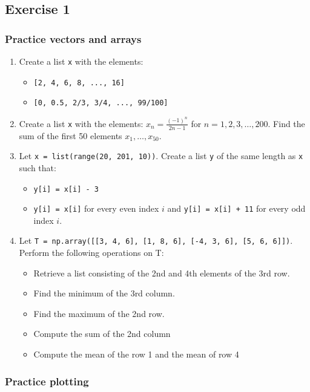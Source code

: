 \subsection*{Exercise 1}
\begin{frame}[fragile]
  \frametitle{Practice vectors and arrays}
  \begin{enumerate}
    \item Create a list \lstinline|x| with the elements:
    \begin{itemize}
      \item \lstinline|[2, 4, 6, 8, ..., 16]|
      \item \lstinline|[0, 0.5, 2/3, 3/4, ..., 99/100]|
    \end{itemize}
    \item Create a list \lstinline|x| with the elements: \(x_n = \frac{(-1)^n}{2n-1}\) for \(n=1,2,3,\ldots,200\). Find the sum of the first 50 elements \(x_1,\ldots,x_{50}\).
    \item Let \lstinline|x = list(range(20, 201, 10))|. Create a list \lstinline|y| of the same length as \lstinline|x| such that:
    \begin{itemize}
      \item \lstinline|y[i] = x[i] - 3|
      \item \lstinline|y[i] = x[i]| for every even index \(i\) and \lstinline|y[i] = x[i] + 11| for every odd index \(i\).
    \end{itemize}
    \item Let \lstinline|T = np.array([[3, 4, 6], [1, 8, 6], [-4, 3, 6], [5, 6, 6]])|. Perform the following operations on T:
    \begin{itemize}
      \item Retrieve a list consisting of the 2nd and 4th elements of the 3rd row.
      \item Find the minimum of the 3rd column.
      \item Find the maximum of the 2nd row.
      \item Compute the sum of the 2nd column
      \item Compute the mean of the row 1 and the mean of row 4
    \end{itemize}
  \end{enumerate}
 \end{frame}


 \begin{frame}[fragile]
  \frametitle{Practice plotting}
 \end{frame}


